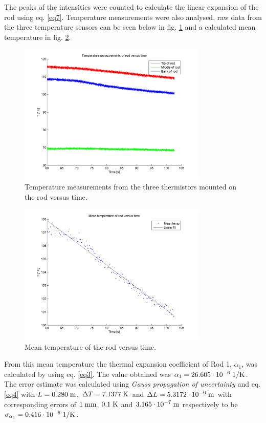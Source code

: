 \FloatBarrier
The peaks of the intensities were counted to calculate the linear expansion of the rod using eq. \eqref{eq7}.  
Temperature measurements were also analysed, raw data from the three temperature sensors can be seen below in fig. \ref{fig:results:2} and a calculated mean temperature in fig. \ref{fig:results:3}.
\begin{figure}[htb]
	\centering
	\includegraphics[width=0.8\textwidth]{img/temp_alu.png}
	\caption{Temperature measurements from the three thermistors mounted on the rod versus time.}
	\label{fig:results:2}
\end{figure}
\begin{figure}[htb]
	\centering
	\includegraphics[width=0.8\textwidth]{img/mtemp_alu.png}
	\caption{Mean temperature of the rod versus time.}
	\label{fig:results:3}
\end{figure}
From this mean temperature the thermal expansion coefficient of Rod 1, $\alpha_1$, was calculated by using eq. \eqref{eq3}. The value obtained was 
$\alpha_1 =26.605 \cdot{10^{-6}} \; \rm{1/K}$.
The error estimate was calculated using \emph{Gauss propagation of uncertainty} and eq. \eqref{eq4} with
$L=0.280 \; \rm{m}$, $\Delta T = 7.1377 \; \rm{K}$ and $\Delta L = 5.3172 \cdot 10^{-6} \; \rm{m}$ with corresponding errors of $1 \; \rm{mm}$, $0.1 \; \rm{K}$ and $3.165 \cdot 10^{-7} \; \rm{m}$ respectively  to be $\sigma_{\alpha_1} = 0.416 \cdot 10^{-6} \; \rm{1/K}$.

